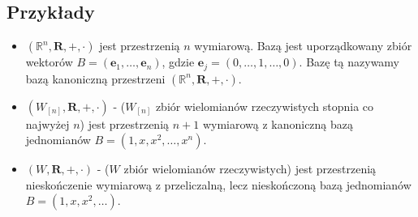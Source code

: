 \documentclass{article}
\begin{document}
\subsection{Przykłady}
\begin{itemize}
    \item $(\mathbb{R}^{n}, \mathbf{R}, +, \cdot)$ jest przestrzenią $n$ wymiarową.
        Bazą jest uporządkowany zbiór wektorów $B=(\mathbf{e}_1,\dots,\mathbf{e}_n)$, gdzie $\mathbf{e}_{j} = (0, \dots, 1, \dots ,0)$.
        Bazę tą nazywamy bazą kanoniczną przestrzeni $(\mathbb{R}^{n}, \mathbf{R}, +, \cdot)$.
    \item $(W_{[n]}, \mathbf{R},+,\cdot)$ - ($W_{[n]}$ zbiór wielomianów rzeczywistych stopnia co najwyżej $n$) jest przestrzenią $n+1$ wymiarową z kanoniczną bazą jednomianów $B = (1,x,x^2,\dots,x^n)$.
    \item $(W, \mathbf{R},+,\cdot)$ - ($W$ zbiór wielomianów rzeczywistych) jest przestrzenią nieskończenie wymiarową z przeliczalną, lecz nieskończoną bazą jednomianów $B = (1,x,x^2,\dots)$.
\end{itemize}
\end{document}
